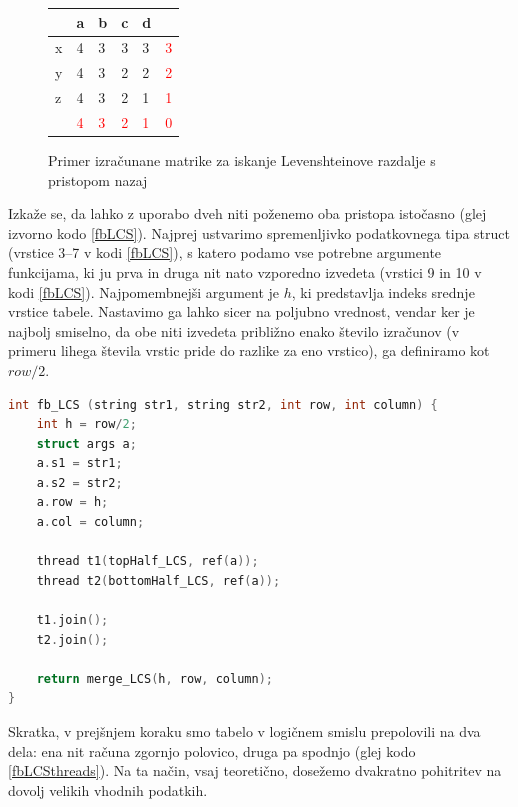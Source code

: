 \documentclass[a4paper,12pt,openright]{book}
\begin{document}
\begin{figure}[htb]
\centering
\begin{tabular}{|l|l|l|l|l|l|}
\cline{2-5}
  \multicolumn{1}{c|}{}  & a & b & c & d\\ \hline
x & \cellcolor{blue!25}4 & \cellcolor{blue!15}3 & 3 & 3 & \textcolor{red}{3}\\ \hline
y  & 4 & 3 &  \cellcolor{blue!15}2 & 2 & \textcolor{red}{2}\\ \hline
z  & 4 & 3 & 2 & \cellcolor{blue!15}1 & \textcolor{red}{1} \\ \hline
\multicolumn{1}{c|}{}  & \textcolor{red}{4} & \textcolor{red}{3} & \textcolor{red}{2} & \textcolor{red}{1} & \textcolor{red}{0} \\ \cline{2-6}
\end{tabular}
\caption{Primer izračunane matrike za iskanje Levenshteinove razdalje s pristopom nazaj}
\label{levenshteinBackwardExample}
\end{figure}

Izkaže se, da lahko z uporabo dveh niti poženemo oba pristopa istočasno (glej izvorno kodo \ref{fbLCS}). Najprej ustvarimo spremenljivko podatkovnega tipa struct (vrstice 3--7 v kodi \ref{fbLCS}), s katero podamo vse potrebne argumente funkcijama, ki ju prva in druga nit nato vzporedno izvedeta (vrstici 9 in 10 v kodi \ref{fbLCS}). Najpomembnejši argument je $h$, ki predstavlja indeks srednje vrstice tabele. Nastavimo ga lahko sicer na poljubno vrednost, vendar ker je najbolj smiselno, da obe niti izvedeta približno enako število izračunov (v primeru lihega števila vrstic pride do razlike za eno vrstico), ga definiramo kot $row/2$. 

\bigskip
\begin{lstlisting}[language=C++, caption={Algoritem LCS naprej-nazaj}, captionpos=b, label=fbLCS]
int fb_LCS (string str1, string str2, int row, int column) {
    int h = row/2;
    struct args a; 
    a.s1 = str1;
    a.s2 = str2;
    a.row = h;
    a.col = column;

    thread t1(topHalf_LCS, ref(a));
    thread t2(bottomHalf_LCS, ref(a));
    
    t1.join();
    t2.join();

    return merge_LCS(h, row, column);
}
\end{lstlisting}

Skratka, v prejšnjem koraku smo tabelo v logičnem smislu prepolovili na dva dela: ena nit računa zgornjo polovico, druga pa spodnjo (glej kodo \ref{fbLCSthreads}). Na ta način, vsaj teoretično, dosežemo dvakratno pohitritev na dovolj velikih vhodnih podatkih. 
\end{document}
